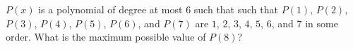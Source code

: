 $P\left(x\right)$ is a polynomial of degree at most $6$ such that such that $P\left(1\right)$, $P\left(2\right)$, $P\left(3\right)$, $P\left(4\right)$, $P\left(5\right)$, $P\left(6\right)$, and $P\left(7\right)$ are $1$, $2$, $3$, $4$, $5$, $6$, and $7$ in some order. What is the maximum possible value of $P\left(8\right)$?
